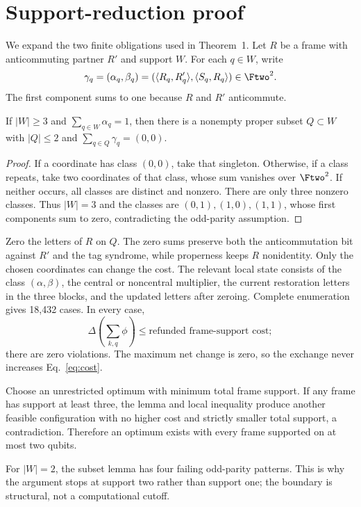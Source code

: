 \section{Support-reduction proof}
\label{app:support-proof}

We expand the two finite obligations used in Theorem~1. Let $R$ be a frame with anticommuting partner $R'$ and support $W$. For each $q\in W$, write
\[
\gamma_q=(\alpha_q,\beta_q)=
(\langle R_q,R'_q\rangle,\langle S_q,R_q\rangle)\in\Ftwo^2.
\]
The first component sums to one because $R$ and $R'$ anticommute.

\begin{lemma}
If $|W|\geq3$ and $\sum_{q\in W}\alpha_q=1$, then there is a nonempty proper subset $Q\subset W$ with $|Q|\leq2$ and $\sum_{q\in Q}\gamma_q=(0,0)$.
\end{lemma}

\begin{proof}
If a coordinate has class $(0,0)$, take that singleton. Otherwise, if a class repeats, take two coordinates of that class, whose sum vanishes over $\Ftwo^2$. If neither occurs, all classes are distinct and nonzero. There are only three nonzero classes. Thus $|W|=3$ and the classes are $(0,1),(1,0),(1,1)$, whose first components sum to zero, contradicting the odd-parity assumption.
\end{proof}

Zero the letters of $R$ on $Q$. The zero sums preserve both the anticommutation bit against $R'$ and the tag syndrome, while properness keeps $R$ nonidentity. Only the chosen coordinates can change the cost. The relevant local state consists of the class $(\alpha,\beta)$, the central or noncentral multiplier, the current restoration letters in the three blocks, and the updated letters after zeroing. Complete enumeration gives 18,432 cases. In every case,
\[
\Delta\!\left(\sum_{k,q}\phi\right)\leq
\text{refunded frame-support cost};
\]
there are zero violations. The maximum net change is zero, so the exchange never increases Eq.~\eqref{eq:cost}.

Choose an unrestricted optimum with minimum total frame support. If any frame has support at least three, the lemma and local inequality produce another feasible configuration with no higher cost and strictly smaller total support, a contradiction. Therefore an optimum exists with every frame supported on at most two qubits.

For $|W|=2$, the subset lemma has four failing odd-parity patterns. This is why the argument stops at support two rather than support one; the boundary is structural, not a computational cutoff.
